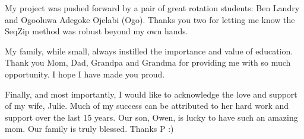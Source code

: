 My project was pushed forward by a pair of great rotation students: Ben Landry and Ogooluwa Adegoke Ojelabi (Ogo). Thanks you two for letting me know the SeqZip method was robust beyond my own hands.

My family, while small, always instilled the importance and value of education. Thank you Mom, Dad, Grandpa and Grandma for providing me with so much opportunity. I hope I have made you proud.

Finally, and most importantly, I would like to acknowledge the love and support of my wife, Julie. Much of my success can be attributed to her hard work and support over the last 15 years. Our son, Owen, is lucky to have such an amazing mom. Our family is truly blessed.  Thanks P :)

\clearpage %